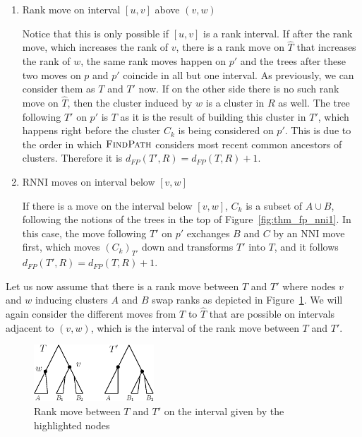\documentclass{amsart}
\newcommand{\rnni}{\mathrm{RNNI}}
\newcommand{\findpath}{\textsc{FindPath}}
\newcommand{\nni}{\mathrm{NNI}}
\begin{document}
\begin{enumerate}
    \item Rank move on interval $[u,v]$ above $(v,w)$

    Notice that this is only possible if $[u,v]$ is a rank interval.
    If after the rank move, which increases the rank of $v$, there is a rank move on $\hat T$ that increases the rank of $w$, the same rank moves happen on $p'$ and the trees after these two moves on $p$ and $p'$ coincide in all but one interval.
    As previously, we can consider them as $T$ and $T'$ now.
    If on the other side there is no such rank move on $\hat T$, then the cluster induced by $w$ is a cluster in $R$ as well.
    The tree following $T'$ on $p'$ is $T$ as it is the result of building this cluster in $T'$, which happens right before the cluster $C_k$ is being considered on $p'$.
    This is due to the order in which $\findpath$ considers most recent common ancestors of clusters.
    Therefore it is $d_{FP}(T',R) = d_{FP}(T,R) + 1$.

    \item $\rnni$ moves on interval below $[v,w]$

    If there is a move on the interval below $[v,w]$, $C_k$ is a subset of $A \cup B$, following the notions of the trees in the top of Figure~\ref{fig:thm_fp_nni1}.
    In this case, the move following $T'$ on $p'$ exchanges $B$ and $C$ by an $\nni$ move first, which moves $(C_k)_{T'}$ down and transforms $T'$ into $T$, and it follows $d_{FP}(T',R) = d_{FP}(T,R) + 1$.
\end{enumerate}

Let us now assume that there is a rank move between $T$ and $T'$ where nodes $v$ and $w$ inducing clusters $A$ and $B$ swap ranks as depicted in Figure~\ref{fig:thm_fp_rank1}.
We will again consider the different moves from $T$ to $\hat T$ that are possible on intervals adjacent to $(v,w)$, which is the interval of the rank move between $T$ and $T'$.


\begin{figure}[!hbt]
\centering
\includegraphics[width=0.4\textwidth]{thm_fp_rank1}
\vspace{12pt}
\caption{Rank move between $T$ and $T'$ on the interval given by the highlighted nodes}
\label{fig:thm_fp_rank1}
\end{figure}
\end{document}
